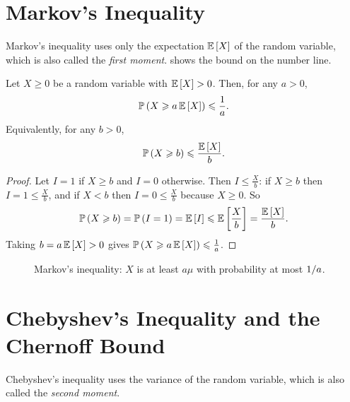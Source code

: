 
\section{Markov's Inequality}

Markov's inequality uses only the expectation $\operatorname{\mathbb{E}}\left[X\right]$ of the random variable, which is
also called the \emph{first moment}.  shows the bound on the number line.

\begin{theorem}\label{thm:markov}
    Let $X \geq 0$ be a random variable with $\operatorname{\mathbb{E}}\left[X\right] > 0$. Then, for any $a > 0$,
    \[\operatorname{\mathbb{P}}\left(X \geqslant a \operatorname{\mathbb{E}}\left[X\right]\right) \leqslant \frac{1}{a}.\]
    Equivalently, for any $b > 0$,
    \[\operatorname{\mathbb{P}}\left(X \geqslant b\right) \leqslant \frac{\operatorname{\mathbb{E}}\left[X\right]}{b}.\]
\end{theorem}

\begin{proof}
    Let $I = 1$ if $X \geq b$ and $I = 0$ otherwise. Then $I \leq \frac{X}{b}$: if $X \geq b$ then
    $I = 1 \leq \frac{X}{b}$, and if $X < b$ then $I = 0 \leq \frac{X}{b}$ because $X \geq 0$. So
    \[\operatorname{\mathbb{P}}\left(X \geqslant b\right) = \operatorname{\mathbb{P}}\left(I = 1\right) = \operatorname{\mathbb{E}}\left[I\right] \leqslant \operatorname{\mathbb{E}}\left[\frac{X}{b}\right] = \frac{\operatorname{\mathbb{E}}\left[X\right]}{b}.\]
    Taking $b = a \operatorname{\mathbb{E}}\left[X\right] > 0$ gives $\operatorname{\mathbb{P}}\left(X \geqslant a \operatorname{\mathbb{E}}\left[X\right]\right) \leqslant \frac{1}{a}$.
\end{proof}

\begin{figure}[ht]
    \centering
    \caption{Markov's inequality: $X$ is at least $a\mu$ with probability at most $1/a$.}
    \label{fig:markov-0903}
\end{figure}

\section{Chebyshev's Inequality and the Chernoff Bound}

Chebyshev's inequality uses the variance of the random variable, which is also called the
\emph{second moment}.

